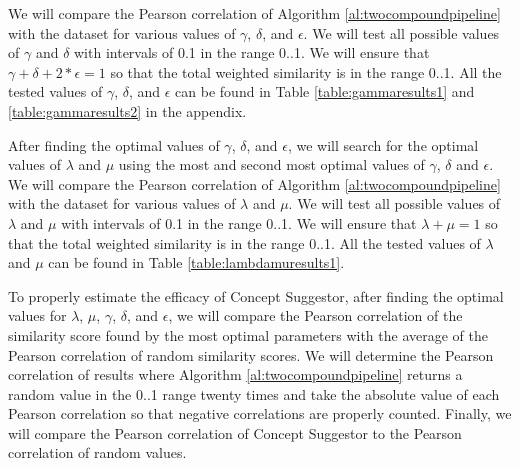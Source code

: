 \documentclass{article}
\begin{document}
We will compare the Pearson correlation of Algorithm \ref{al:twocompoundpipeline} with the dataset for various values of $\gamma$, $\delta$, and $\epsilon$. We will test all possible values of $\gamma$ and $\delta$ with intervals of 0.1 in the range 0..1. We will ensure that $\gamma + \delta + 2 * \epsilon = 1$ so that the total weighted similarity is in the range 0..1. All the tested values of $\gamma$, $\delta$, and $\epsilon$ can be found in Table \ref{table:gammaresults1} and \ref{table:gammaresults2} in the appendix. 

After finding the optimal values of $\gamma$, $\delta$, and $\epsilon$, we will search for the optimal values of $\lambda$ and $\mu$ using the most and second most optimal values of $\gamma$, $\delta$ and $\epsilon$. We will compare the Pearson correlation of Algorithm \ref{al:twocompoundpipeline} with the dataset for various values of $\lambda$ and $\mu$. We will test all possible values of $\lambda$ and $\mu$ with intervals of 0.1 in the range 0..1. We will ensure that $\lambda + \mu = 1$ so that the total weighted similarity is in the range 0..1. All the tested values of $\lambda$ and $\mu$ can be found in Table \ref{table:lambdamuresults1}.

To properly estimate the efficacy of Concept Suggestor, after finding the optimal values for $\lambda$, $\mu$, $\gamma$, $\delta$, and $\epsilon$, we will compare the Pearson correlation of the similarity score found by the most optimal parameters with the average of the Pearson correlation of random similarity scores. We will determine the Pearson correlation of results where Algorithm \ref{al:twocompoundpipeline} returns a random value in the 0..1 range twenty times and take the absolute value of each Pearson correlation so that negative correlations are properly counted. Finally, we will compare the Pearson correlation of Concept Suggestor to the Pearson correlation of random values.



\end{document}
